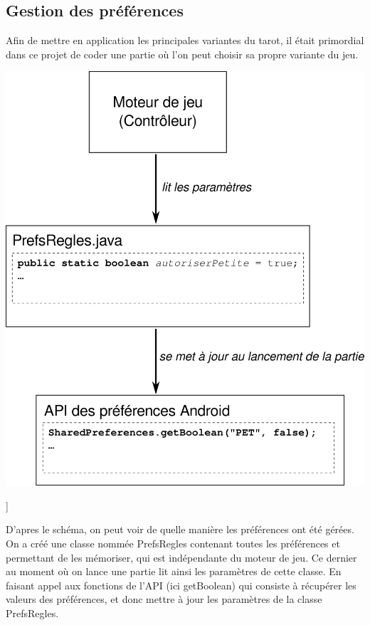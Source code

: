 \documentclass[a4paper]{report}
\begin{document}
		\subsection{Gestion des préférences}
			Afin de mettre en application les principales variantes du tarot, il était primordial dans ce projet de coder une partie où l’on peut choisir sa propre variante du jeu.\\
\begin{center}
\includegraphics[scale=0.3]{Images/prefs.png}\\
\end{center}
]

D’apres le schéma, on peut voir de quelle manière les préférences ont été gérées. On a créé une classe nommée PrefsRegles contenant toutes les préférences et permettant de les mémoriser, qui est indépendante du moteur de jeu. Ce dernier au moment où on lance une partie lit ainsi les paramètres de cette classe. En faisant appel aux fonctions de l’API (ici getBoolean) qui consiste à récupérer les valeurs des préférences, et donc mettre à jour les paramètres de la classe PrefsRegles.
\end{document}
